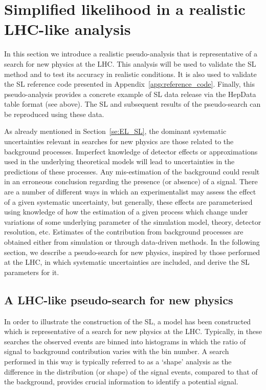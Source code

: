 \documentclass[11pt]{article}
\begin{document}
\section{Simplified likelihood in a  realistic LHC-like analysis }
\label{se:SL_LHC}

In this section we introduce a realistic pseudo-analysis that is representative of a search for new physics at the LHC. 
This analysis will be used to validate the SL method and to test its accuracy in realistic conditions. 
It is also used to validate the SL reference code presented in Appendix~\ref{app:reference_code}. 
Finally, this pseudo-analysis provides a concrete example of SL data release via the HepData table format (see above). 
The SL and subsequent results of the pseudo-search can be reproduced using these data. 

As already mentioned in Section~\ref{se:EL_SL}, the dominant systematic uncertainties relevant in searches for new physics are those related to the background processes. 
Imperfect knowledge of detector effects or approximations used in the underlying theoretical models will lead to uncertainties in the predictions of these processes.
Any mis-estimation of the background could result in an erroneous conclusion regarding the presence (or absence) of a signal.
There are a number of different ways in which an experimentalist may assess the effect of a given systematic uncertainty, but generally, these effects are parameterised using knowledge of how the estimation of a given process which change under variations of some underlying parameter of the simulation model, theory, detector resolution, etc. Estimates of the contribution from background processes are obtained either from simulation or through  data-driven methods.
In the following section, we describe a pseudo-search for new physics, inspired by those performed at the LHC, in which systematic uncertainties are included, and derive the SL parameters for it.


\subsection{A LHC-like pseudo-search for new physics}
\label{se:toy_search}

In order to illustrate the construction of the SL, a model has been constructed which is representative of a search for new physics at the LHC. Typically, in these searches the observed events are binned into histograms in which the ratio of signal to background contribution varies with the bin number. A search performed in this way is typically referred to as a `shape' analysis as the difference in the distribution (or shape) of the signal events, compared to that of the background, provides crucial information to identify a potential signal.
\end{document}

